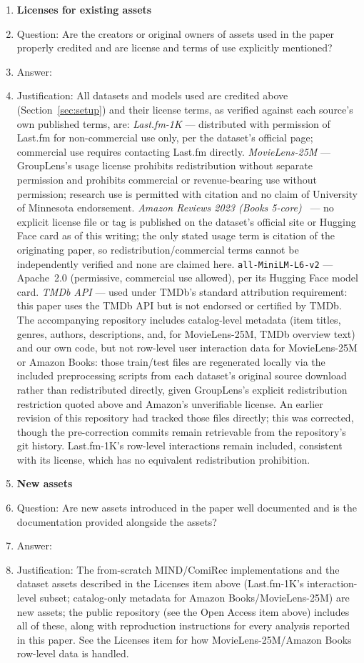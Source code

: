 \documentclass{article}
\begin{document}
\begin{enumerate}
\item {\bf Licenses for existing assets}
    \item[] Question: Are the creators or original owners of assets used in the paper properly credited and are license and terms of use explicitly mentioned?
    \item[] Answer: \answerYes{}
    \item[] Justification: All datasets and models used are credited above (Section~\ref{sec:setup}) and their license terms, as verified against each source's own published terms, are: \emph{Last.fm-1K} --- distributed with permission of Last.fm for non-commercial use only, per the dataset's official page; commercial use requires contacting Last.fm directly. \emph{MovieLens-25M} --- GroupLens's usage license prohibits redistribution without separate permission and prohibits commercial or revenue-bearing use without permission; research use is permitted with citation and no claim of University of Minnesota endorsement. \emph{Amazon Reviews 2023 (Books 5-core)}~\cite{hou2024} --- no explicit license file or tag is published on the dataset's official site or Hugging Face card as of this writing; the only stated usage term is citation of the originating paper, so redistribution/commercial terms cannot be independently verified and none are claimed here. \texttt{all-MiniLM-L6-v2} --- Apache~2.0 (permissive, commercial use allowed), per its Hugging Face model card. \emph{TMDb API} --- used under TMDb's standard attribution requirement: this paper uses the TMDb API but is not endorsed or certified by TMDb. The accompanying repository includes catalog-level metadata (item titles, genres, authors, descriptions, and, for MovieLens-25M, TMDb overview text) and our own code, but not row-level user interaction data for MovieLens-25M or Amazon Books: those train/test files are regenerated locally via the included preprocessing scripts from each dataset's original source download rather than redistributed directly, given GroupLens's explicit redistribution restriction quoted above and Amazon's unverifiable license. An earlier revision of this repository had tracked those files directly; this was corrected, though the pre-correction commits remain retrievable from the repository's git history. Last.fm-1K's row-level interactions remain included, consistent with its license, which has no equivalent redistribution prohibition.

\item {\bf New assets}
    \item[] Question: Are new assets introduced in the paper well documented and is the documentation provided alongside the assets?
    \item[] Answer: \answerYes{}
    \item[] Justification: The from-scratch MIND/ComiRec implementations and the dataset assets described in the Licenses item above (Last.fm-1K's interaction-level subset; catalog-only metadata for Amazon Books/MovieLens-25M) are new assets; the public repository (see the Open Access item above) includes all of these, along with reproduction instructions for every analysis reported in this paper. See the Licenses item for how MovieLens-25M/Amazon Books row-level data is handled.


\end{enumerate}
\end{document}
